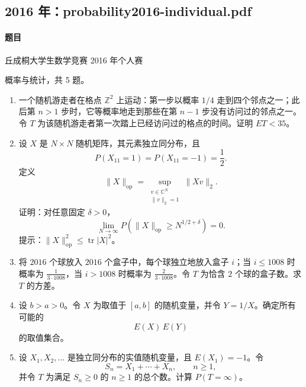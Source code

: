 \documentclass[UTF8,12pt]{ctexart}
\begin{document}
\subsection{2016 年：probability2016-individual.pdf}
\paragraph{题目}
丘成桐大学生数学竞赛 2016 年个人赛

概率与统计，共 5 题。

\begin{enumerate}[label=\textbf{\arabic*.},leftmargin=2.2em]
\item 一个随机游走者在格点 \(\mathbb Z^2\) 上运动：第一步以概率 \(1/4\) 走到四个邻点之一；此后第 \(n>1\) 步时，它等概率地走到那些在第 \(n-1\) 步没有访问过的邻点之一。令 \(T\) 为该随机游走者第一次踏上已经访问过的格点的时间。证明 \(E T<35\)。

\item 设 \(X\) 是 \(N\times N\) 随机矩阵，其元素独立同分布，且
\[
P(X_{11}=1)=P(X_{11}=-1)=\frac12.
\]
定义
\[
\|X\|_{\operatorname{op}}=\sup_{\substack{v\in\mathbb C^N\\ \|v\|_2=1}}\|Xv\|_2.
\]
证明：对任意固定 \(\delta>0\)，
\[
\lim_{N\to\infty}P(\|X\|_{\operatorname{op}}\ge N^{1/2+\delta})=0.
\]
提示：\(\|X\|_{\operatorname{op}}^2\le \operatorname{tr}|X|^2\)。

\item 将 \(2016\) 个球放入 \(2016\) 个盒子中，每个球独立地放入盒子 \(i\)；当 \(i\le1008\) 时概率为 \(\frac1{3\cdot1008}\)，当 \(i>1008\) 时概率为 \(\frac2{3\cdot1008}\)。令 \(T\) 为恰含 \(2\) 个球的盒子数。求 \(T\) 的方差。

\item 设 \(b>a>0\)。令 \(X\) 为取值于 \([a,b]\) 的随机变量，并令 \(Y=1/X\)。确定所有可能的
\[
E(X)\,E(Y)
\]
的取值集合。

\item 设 \(X_1,X_2,\ldots\) 是独立同分布的实值随机变量，且 \(E(X_1)=-1\)。令
\[
S_n=X_1+\cdots+X_n,\qquad n\ge1,
\]
并令 \(T\) 为满足 \(S_n\ge0\) 的 \(n\ge1\) 的总个数。计算 \(P(T=\infty)\)。
\end{enumerate}
\end{document}
